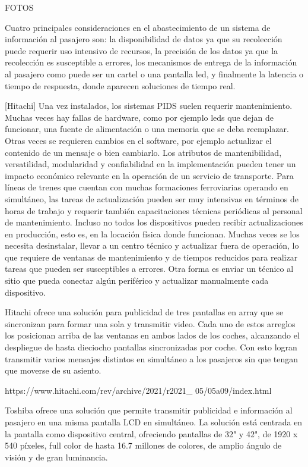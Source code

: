 FOTOS

Cuatro principales consideraciones en el abastecimiento de un sistema de información al pasajero son: la disponibilidad de datos ya que su recolección puede requerir uso intensivo de recursos, la precisión de los datos ya que la recolección es susceptible a errores, los mecanismos de entrega de la información al pasajero como puede ser un cartel o una pantalla led, y finalmente la latencia o tiempo de respuesta, donde aparecen soluciones de tiempo real.

[Hitachi] Una vez instalados, los sistemas PIDS suelen requerir mantenimiento. Muchas veces hay fallas de hardware, como por ejemplo leds que dejan de funcionar, una fuente de alimentación o una memoria que se deba reemplazar. Otras veces se requieren cambios en el software, por ejemplo actualizar el contenido de un mensaje o bien cambiarlo. Los atributos de mantenibilidad, versatilidad, modularidad y confiabilidad en la implementación pueden tener un impacto económico relevante en la operación de un servicio de transporte. Para líneas de trenes que cuentan con muchas formaciones ferroviarias operando en simultáneo, las tareas de actualización pueden ser muy intensivas en términos de horas de trabajo y requerir también capacitaciones técnicas periódicas al personal de mantenimiento. Incluso no todos los dispositivos pueden recibir actualizaciones en producción, esto es, en la locación física donde funcionan. Muchas veces se los necesita desinstalar, llevar a un centro técnico y actualizar fuera de operación, lo que requiere de ventanas de mantenimiento y de tiempos reducidos para realizar tareas que pueden ser susceptibles a errores. Otra forma es enviar un técnico al sitio que pueda conectar algún periférico y actualizar manualmente cada dispositivo.

Hitachi ofrece una solución para publicidad de tres pantallas en array que se sincronizan para formar una sola y transmitir video. Cada uno de estos arreglos los posicionan arriba de las ventanas en ambos lados de los coches, alcanzando el despliegue de hasta dieciocho pantallas sincronizadas por coche. Con esto logran transmitir varios mensajes distintos en simultáneo a los pasajeros sin que tengan que moverse de su asiento.

https://www.hitachi.com/rev/archive/2021/r2021\_ 05/05a09/index.html

Toshiba ofrece una solución que permite transmitir publicidad e información al pasajero en una misma pantalla LCD en simultáneo. La solución está centrada en la pantalla como dispositivo central, ofreciendo pantallas de 32" y 42", de 1920 x 540 píxeles, full color de hasta 16.7 millones de colores, de amplio ángulo de visión y de gran luminancia.

